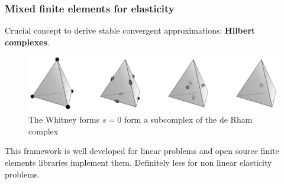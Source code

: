 \documentclass[aspectratio=169]{beamer}
\DeclareMathOperator*{\grad}{grad}
\renewcommand{\div}{\operatorname{div}}
\DeclareMathOperator*{\curl}{curl}
\begin{document}
\begin{frame}[fragile]\frametitle{Mixed finite elements for elasticity}
	Crucial concept to derive stable convergent approximations: \textbf{Hilbert complexes}.
	
	\begin{figure}
		\centering
			\includegraphics[width=.75\textwidth]{Whitney.png}
		\caption*{The Whitney forms $s=0$ form a subcomplex of the de Rham complex}
	\end{figure}
	This framework is well developed for linear problems  and open source finite elements libraries implement them. 	Definitely less for non linear elasticity problems. \vspace{.2cm}
	
\end{frame}
\end{document}
